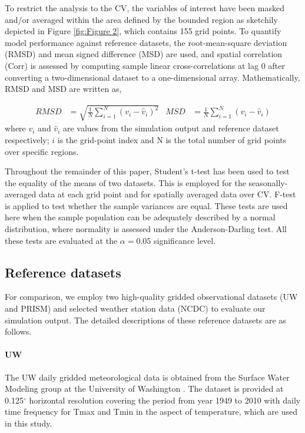 To restrict the analysis to the CV, the variables of interest have been masked and/or averaged within the area defined by the bounded region as sketchily depicted in Figure \ref{fig:Figure 2}, which contains 155 grid points. To quantify model performance against reference datasets, the root-mean-square deviation (RMSD) and mean signed difference (MSD) are used, and spatial correlation (Corr) is assessed by computing sample linear cross-correlations at lag 0 after converting a two-dimensional dataset to a one-dimensional array. Mathematically, RMSD and MSD are written as, 

\begin{align}
RMSD &= \sqrt{\frac{1}{N} \sum_{i=1}^{N} (v_i - \hat{v}_i)^2}  & MSD &= \frac{1}{N} \sum_{i=1}^{N} (v_i - \hat{v}_i) 
\end{align} where $v_i$ and $\hat{v}_i$ are values from the simulation output and reference dataset respectively; $i$ is the grid-point index and N is the total number of grid points over specific regions.

Throughout the remainder of this paper, Student's t-test has been used to test the equality of the means of two datasets. This is employed for the seasonally-averaged data at each grid point and for spatially averaged data over CV. F-test is applied to test whether the sample variances are equal. These tests are used here when the sample population can be adequately described by a normal distribution, where normality is assessed under the Anderson-Darling test. All these tests are evaluated at the $\alpha = 0.05$ significance level. 

\subsection{Reference datasets}

For comparison, we employ two high-quality gridded observational datasets (UW and PRISM) and selected weather station data (NCDC) to evaluate our simulation output. The detailed descriptions of these reference datasets are as follows.

\paragraph{UW} The UW daily gridded meteorological data is obtained from the Surface Water Modeling group at the University of Washington \cite{maurer2002long, hamlet2005production}. The dataset is provided at 0.125$^\circ$ horizontal resolution covering the period from year 1949 to 2010 with daily time frequency for Tmax and Tmin in the aspect of temperature, which are used in this study.

